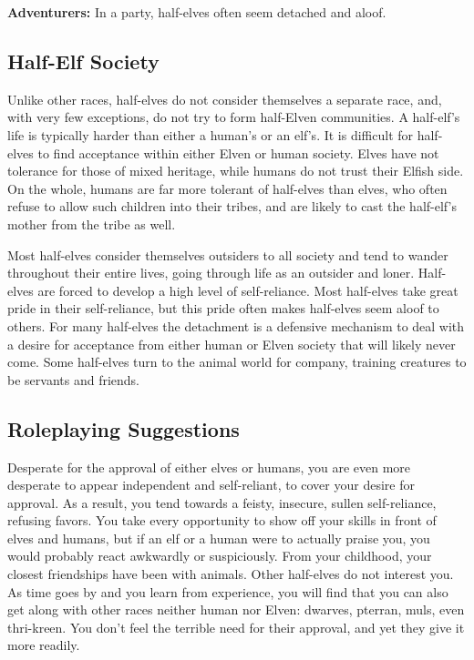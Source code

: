 \textbf{Adventurers:} In a party, half-elves often seem detached and aloof.

\subsection{Half-Elf Society}
Unlike other races, half-elves do not consider themselves a separate race, and, with very few exceptions, do not try to form half-Elven communities. A half-elf's life is typically harder than either a human's or an elf's. It is difficult for half-elves to find acceptance within either Elven or human society. Elves have not tolerance for those of mixed heritage, while humans do not trust their Elfish side. On the whole, humans are far more tolerant of half-elves than elves, who often refuse to allow such children into their tribes, and are likely to cast the half-elf's mother from the tribe as well.

Most half-elves consider themselves outsiders to all society and tend to wander throughout their entire lives, going through life as an outsider and loner. Half-elves are forced to develop a high level of self-reliance. Most half-elves take great pride in their self-reliance, but this pride often makes half-elves seem aloof to others. For many half-elves the detachment is a defensive mechanism to deal with a desire for acceptance from either human or Elven society that will likely never come. Some half-elves turn to the animal world for company, training creatures to be servants and friends.

\subsection{Roleplaying Suggestions}
Desperate for the approval of either elves or humans, you are even more desperate to appear independent and self-reliant, to cover your desire for approval. As a result, you tend towards a feisty, insecure, sullen self-reliance, refusing favors. You take every opportunity to show off your skills in front of elves and humans, but if an elf or a human were to actually praise you, you would probably react awkwardly or suspiciously. From your childhood, your closest friendships have been with animals. Other half-elves do not interest you. As time goes by and you learn from experience, you will find that you can also get along with other races neither human nor Elven: dwarves, pterran, muls, even thri-kreen. You don't feel the terrible need for their approval, and yet they give it more readily.

